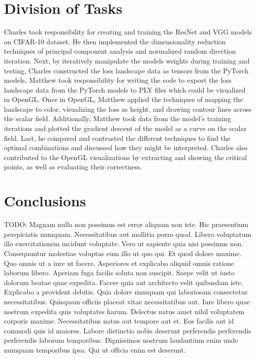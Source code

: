 \documentclass{acmsiggraph}
\begin{document}
\section{Division of Tasks}
\label{sec:intro}

Charles took responsibility for creating and training the ResNet and VGG models on CIFAR-10 dataset.
He then implemented the dimensionality reduction techniques of principal component analysis and normalized random direction iteration.
Next, by iteratively manipulate the models weights during training and testing, Charles constructed the loss landscape data as tensors from the PyTorch models.
Matthew took responsibility for writing the code to export the loss landscape data from the PyTorch models to PLY files which could be visualized in OpenGL.
Once in OpenGL, Matthew applied the techniques of mapping the landscape to color, visualizing the loss as height, and drawing contour lines across the scalar field.
Additionally, Matthew took data from the model's training iterations and plotted the gradient descent of the model as a curve on the scalar field.
Last, he compared and contrasted the different techniques to find the optimal combinations and discussed how they might be interpreted.
Charles also contributed to the OpenGL visualizations by extracting and showing the critical points, as well as evaluating their correctness.



\section{Conclusions}
\label{sec:intro}

TODO:
Magnam nulla non possimus est error aliquam non iste. Hic praesentium perspiciatis numquam. Necessitatibus aut mollitia porro quod. Libero voluptatum illo exercitationem incidunt voluptate. Vero ut sapiente quia nisi possimus non. Consequuntur molestiae voluptas eum illo ut quo qui.
Et quod dolore maxime. Quo omnis ut a iure ut facere. Asperiores et explicabo aliquid omnis ratione laborum libero. Aperiam fuga facilis soluta non suscipit.
Saepe velit ut iusto dolorum beatae quae expedita. Facere quia aut architecto velit quibusdam iste. Explicabo a provident debitis. Quia dolore numquam qui laboriosam consectetur necessitatibus.
Quisquam officiis placeat vitae necessitatibus aut. Iure libero quae nostrum expedita quis voluptates harum. Delectus natus amet nihil voluptatem corporis maxime. Necessitatibus natus aut tempore aut et.
Eos facilis aut id commodi quis id maiores. Labore distinctio nobis deserunt perferendis perferendis perferendis laborum temporibus. Dignissimos nostrum laudantium enim unde numquam temporibus ipsa. Qui ut officia enim est deserunt.




\nocite{*}

\end{document}
